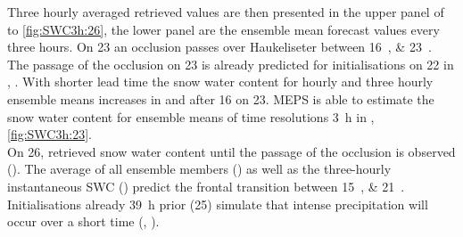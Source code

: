 Three hourly averaged retrieved values are then presented in the upper panel of  to \ref{fig:SWC3h:26}, the lower panel are the ensemble mean forecast values every three hours.
On \SI{23}{\dec} an occlusion passes over Haukeliseter between \SIlist{16;23}{\UTC}. The passage of the occlusion on \SI{23}{\dec} is already predicted for initialisations on \SI{22}{\dec} in , . 
With shorter lead time the snow water content for hourly and three hourly ensemble means increases in  and  after \SI{16}{\UTC} on \SI{23}{\dec}. MEPS is able to estimate the snow water content for ensemble means of time resolutions \SI{3}{\hour} in , \ref{fig:SWC3h:23}.
\\
On \SI{26}{\dec}, retrieved snow water content until the passage of the occlusion is observed (). The average of all ensemble members () as well as the three-hourly instantaneous SWC () predict the frontal transition between \SIlist{15;21}{\UTC}. Initialisations already \SI{39}{\hour} prior (\SI{25}{\dec}) simulate that intense precipitation will occur over a short time (, ). 
\\

